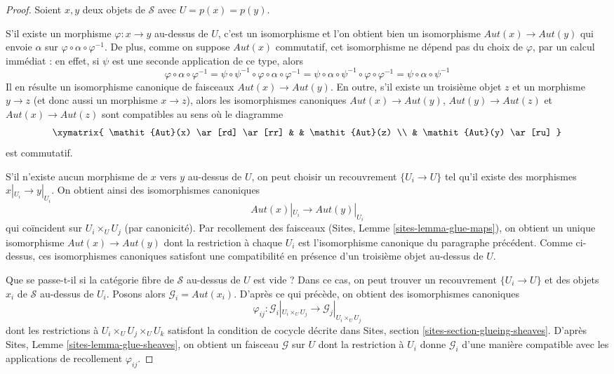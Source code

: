 \begin{proof}
Soient $x, y$ deux objets de $\mathcal{S}$ avec $U = p(x) = p(y)$.

\medskip\noindent
S'il existe un morphisme $\varphi : x \to y$ au-dessus de $U$, c'est un
isomorphisme et l'on obtient bien un isomorphisme
$\mathit{Aut}(x) \to \mathit{Aut}(y)$ qui envoie
$\alpha$ sur $\varphi \circ \alpha \circ \varphi^{-1}$.
De plus, comme on suppose $\mathit{Aut}(x)$
commutatif, cet isomorphisme ne dépend pas du choix
de $\varphi$, par un calcul immédiat : en effet, si $\psi$ est
une seconde application de ce type, alors
$$
\varphi \circ \alpha \circ \varphi^{-1} =
\psi \circ \psi^{-1} \circ \varphi \circ \alpha \circ \varphi^{-1} =
\psi \circ \alpha \circ \psi^{-1} \circ \varphi \circ \varphi^{-1} =
\psi \circ \alpha \circ \psi^{-1}
$$
Il en résulte un isomorphisme canonique de faisceaux
$\mathit{Aut}(x) \to \mathit{Aut}(y)$. En outre, s'il existe
un troisième objet $z$ et un morphisme $y \to z$ (et donc
aussi un morphisme $x \to z$), alors les
isomorphismes canoniques $\mathit{Aut}(x) \to \mathit{Aut}(y)$,
$\mathit{Aut}(y) \to \mathit{Aut}(z)$ et
$\mathit{Aut}(x) \to \mathit{Aut}(z)$ sont compatibles au sens
où le diagramme
$$
\xymatrix{
\mathit{Aut}(x) \ar[rd] \ar[rr] & &  \mathit{Aut}(z) \\
& \mathit{Aut}(y) \ar[ru]
}
$$
est commutatif.

\medskip\noindent
S'il n'existe aucun morphisme de $x$ vers $y$ au-dessus de $U$, on peut
choisir un recouvrement $\{U_i \to U\}$ tel qu'il existe des morphismes
$x|_{U_i} \to y|_{U_i}$. On obtient ainsi des isomorphismes canoniques
$$
\mathit{Aut}(x)|_{U_i} \longrightarrow \mathit{Aut}(y)|_{U_i}
$$
qui coïncident sur $U_i \times_U U_j$ (par canonicité). Par recollement des
faisceaux (Sites, Lemme \ref{sites-lemma-glue-maps}), on obtient un unique
isomorphisme $\mathit{Aut}(x) \to \mathit{Aut}(y)$ dont la restriction
à chaque $U_i$ est l'isomorphisme canonique du paragraphe précédent.
Comme ci-dessus, ces isomorphismes canoniques satisfont une
compatibilité en présence d'un troisième objet au-dessus de $U$.

\medskip\noindent
Que se passe-t-il si la catégorie fibre de $\mathcal{S}$ au-dessus de $U$ est vide ?
Dans ce cas, on peut trouver un recouvrement $\{U_i \to U\}$
et des objets $x_i$ de $\mathcal{S}$ au-dessus de $U_i$. Posons alors
$\mathcal{G}_i = \mathit{Aut}(x_i)$. D'après ce qui précède, on obtient
des isomorphismes canoniques
$$
\varphi_{ij} :
\mathcal{G}_i|_{U_i \times_U U_j}
\longrightarrow
\mathcal{G}_j|_{U_i \times_U U_j}
$$
dont les restrictions à $U_i \times_U U_j \times_U U_k$ satisfont
la condition de cocycle décrite dans Sites, section
\ref{sites-section-glueing-sheaves}.
D'après Sites, Lemme \ref{sites-lemma-glue-sheaves},
on obtient un faisceau $\mathcal{G}$ sur $U$ dont la
restriction à $U_i$ donne $\mathcal{G}_i$
d'une manière compatible avec les applications de recollement $\varphi_{ij}$.


\end{proof}
